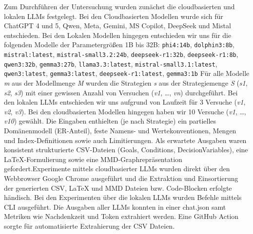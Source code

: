 \documentclass[runningheads]{llncs}
\begin{document}
Zum Durchführen der Untersuchung wurden zunächst die cloudbasierten und lokalen LLMs festgelegt. Bei den Cloudbasierten Modellen wurde sich für ChatGPT 4 und 5, Qwen, Meta, Gemini, MS Copilot, DeepSeek und Mistal entschieden. Bei den Lokalen Modellen hingegen entschieden wir uns für die folgenden Modelle der Parametergrößen 1B bis 32B: \texttt{phi4:14b}, \texttt{dolphin3:8b}, \texttt{mistral:latest}, \texttt{mistral-small3.2:24b}, \texttt{deepseek-r1:32b}, \texttt{deepseek-r1:8b}, \texttt{qwen3:32b}, \texttt{gemma3:27b}, \texttt{llama3.3:latest}, \texttt{mistral-small3.1:latest}, \texttt{qwen3:latest}, \texttt{gemma3:latest}, \texttt{deepseek-r1:latest}, \texttt{gemma3:1b} Für alle Modelle \emph{m} aus der Modellmenge \emph{M} wurden die Strategien \emph{s} aus der Strategiemenge \emph{S} (\emph{s1}, \emph{s2}, \emph{s3}) mit einer gewissen Anzahl von Versuchen (\emph{v1}, \ldots, \emph{vn}) durchgeführt. Bei den lokalen LLMs entschieden wir uns aufgrund von Laufzeit für 3 Versuche (\emph{v1}, \emph{v2}, \emph{v3}). Bei den cloudbasierten Modellen hingegen haben wir 10 Versuche (\emph{v1}, \ldots, \emph{v10}) gewählt. Die Eingaben enthielten (je nach Strategie) ein partielles Domänenmodell (ER-Anteil), feste Namens- und Wertekonventionen, Mengen und Index-Definitionen sowie auch Limitierungen. Als erwartete Ausgaben waren konsistent strukturierte CSV-Dateien (Goals, Conditions, DecisionVariables), eine LaTeX-Formulierung sowie eine MMD-Graphrepräsentation gefordert.Experimente mittels cloudbasierter LLMs wurden direkt über den Webbrowser Google Chrome ausgeführt und die Extraktion und Einsortierung der generierten CSV, LaTeX und MMD Dateien bzw. Code-Blocken erfolgte händisch.
Bei den Experimenten über die lokalen LLMs wurden Befehle mittels CLI ausgeführt. Die Ausgaben aller LLMs konnten in einer chat.json samt Metriken wie Nachdenkzeit und Token extrahiert werden. Eine GitHub Action sorgte für automatisierte Extrahierung der CSV Dateien.

\end{document}
